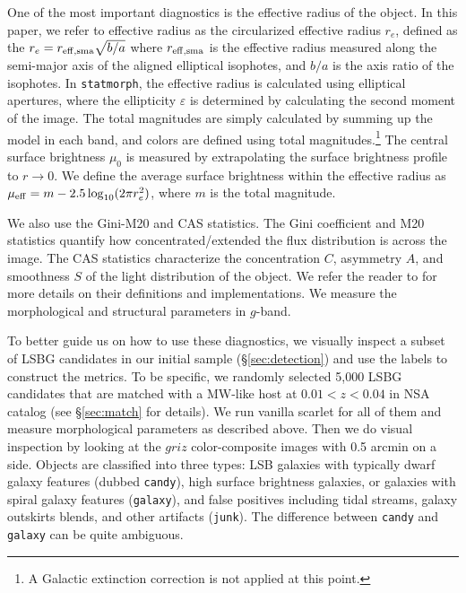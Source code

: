 \documentclass[twocolumn,astrosymb,twocolappendix]{aastex631}
\newcommand{\code}[1]{\texttt{#1}}
\begin{document}
\begin{CJK*}{UTF8}{gbsn}
One of the most important diagnostics is the effective radius of the object. In this paper, we refer to effective radius as the circularized effective radius $r_{e}$, defined as the $r_{e} = r_{\rm eff, sma} \sqrt{b/a}$ where $r_{\rm eff, sma}$ is the effective radius measured along the semi-major axis of the aligned elliptical isophotes, and $b/a$ is the axis ratio of the isophotes. In \code{statmorph}, the effective radius is calculated using elliptical apertures, where the ellipticity $\varepsilon$ is determined by calculating the second moment of the image. The total magnitudes are simply calculated by summing up the model in each band, and colors are defined using total magnitudes.\footnote{A Galactic extinction correction is not applied at this point.} The central surface brightness $\mu_0$ is measured by extrapolating the surface brightness profile to $r\to 0$. We define the average surface brightness within the effective radius as $\mu_{\rm eff} = m - 2.5 \log_{10}(2 \pi r_e^2)$, where $m$ is the total magnitude. 

We also use the Gini-M20 and CAS statistics. The Gini coefficient and M20 statistics \citep{Abraham2003,Lotz2004} quantify how concentrated/extended the flux distribution is across the image. The CAS statistics characterize the concentration $C$, asymmetry $A$, and smoothness $S$ of the light distribution of the object. We refer the reader to \citet{statmorph} for more details on their definitions and implementations. We measure the morphological and structural parameters in $g$-band. %

To better guide us on how to use these diagnostics, we visually inspect a subset of LSBG candidates in our initial sample (\S \ref{sec:detection}) and use the labels to construct the metrics. To be specific, we randomly selected 5,000 LSBG candidates that are matched with a MW-like host at $0.01 < z < 0.04$ in NSA catalog (see \S\ref{sec:match} for details). We run vanilla scarlet for all of them and measure morphological parameters as described above. Then we do visual inspection by looking at the $griz$ color-composite images with 0.5 arcmin on a side. Objects are classified into three types: LSB galaxies with typically dwarf galaxy features (dubbed \code{candy}), high surface brightness galaxies, or galaxies with spiral galaxy features (\code{galaxy}), and false positives including tidal streams, galaxy outskirts blends, and other artifacts (\code{junk}). The difference between \code{candy} and \code{galaxy} can be quite ambiguous. 


\end{CJK*}
\end{document}
